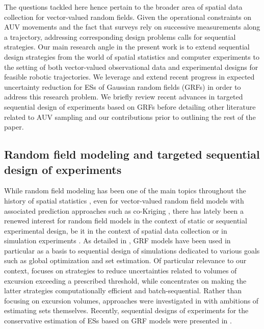 \documentclass[aoas,preprint]{imsart}
\begin{document}
The questions tackled here hence pertain to the broader area of
spatial data collection for vector-valued random fields.
Given the operational constraints on AUV movements and the fact that
surveys rely on successive measurements along a trajectory, addressing
corresponding design problems calls for sequential strategies.  Our
main research angle in the present work is to extend sequential design
strategies from the world of spatial statistics and computer
experiments to the setting of both vector-valued observational data
and experimental designs for feasible robotic trajectories. We
leverage and extend recent progress in expected uncertainty reduction
for ESs of Gaussian random fields (GRFs) in order to address this
research problem. 
We briefly review recent advances in targeted sequential design of
experiments based on GRFs before detailing other literature related to
AUV sampling and our contributions prior to outlining the rest of the
paper.


\subsection{Random field modeling and targeted sequential design of experiments}
  
While random field modeling has been one of the main topics throughout
the history of spatial statistics \citep{Krige1951a,Stein1999}, even
for vector-valued random field models with associated prediction
approaches such as co-Kriging \citep[See, e.g.,][]{Wackernagel2003},
there has lately been a renewed interest for random field models in
the context of static or sequential experimental design, be it in the
context of spatial data collection \citep{Mueller2007} or in
simulation experiments \citep{Santner.etal2003}. As detailed in
\cite{Ginsbourger2018}, GRF models have been used in particular as a
basis to sequential design of simulations dedicated to various goals
such as global optimization and set estimation. Of particular
relevance to our context, \cite{Bect.etal2012} focuses on strategies
to reduce uncertainties related to volumes of excursion exceeding a
prescribed threshold, while \cite{chevalier2014fast} concentrates on
making the latter strategies computationally efficient and
batch-sequential. Rather than focusing on excursion volumes,
approaches were investigated in
\cite{French.Sain2013,Chevalier.etal2013b,Bolin.Lindgren2015,Azzimonti.etal2016}
with ambitions of estimating sets themselves. Recently, sequential
designs of experiments for the conservative estimation of ESs based on
GRF models were presented in \citep{Azzimonti.etal}.
\end{document}
